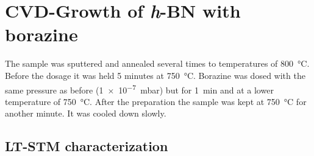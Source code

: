 \section{CVD-Growth of \textit{h}-BN with borazine}
The sample was sputtered and annealed several times to temperatures of \SI{800}{\celsius}. Before the dosage it was held 5 minutes at \SI{750}{\celsius}. Borazine was dosed with the same pressure as before (\SI{1e-7}{\milli \bar}) but for \SI{1}{\minute} and at a lower temperature of \SI{750}{\celsius}. After the preparation the sample was kept at \SI{750}{\celsius} for another minute. It was cooled down slowly.
	 \subsection{LT-STM characterization}

	
